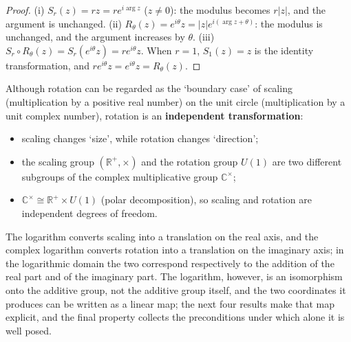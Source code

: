 \begin{proof}
(i) $S_r(z) = rz = re^{i\arg z}$ ($z \neq 0$): the modulus becomes $r|z|$, and the argument is unchanged.
(ii) $R_\theta(z) = e^{i\theta}z = |z|e^{i(\arg z + \theta)}$: the modulus is unchanged, and the argument increases by $\theta$.
(iii) $S_r \circ R_\theta(z) = S_r(e^{i\theta}z) = re^{i\theta}z$.
When $r = 1$, $S_1(z) = z$ is the identity transformation, and $re^{i\theta}z = e^{i\theta}z = R_\theta(z)$.
\end{proof}

\begin{remark}\label{rem:rotation_independence}
Although rotation can be regarded as the `boundary case' of scaling (multiplication by a positive real number) on the unit circle (multiplication by a unit complex number), rotation is an \textbf{independent transformation}:
\begin{itemize}
    \item scaling changes `size', while rotation changes `direction';
    \item the scaling group $(\mathbb{R}^+,\times)$ and the rotation group $U(1)$ are two different subgroups of the complex multiplicative group $\mathbb{C}^{\times}$;
    \item $\mathbb{C}^{\times} \cong \mathbb{R}^+ \times U(1)$ (polar decomposition), so scaling and rotation are independent degrees of freedom.
\end{itemize}
The logarithm converts scaling into a translation on the real axis, and the complex logarithm converts rotation into a translation on the imaginary axis; in the logarithmic domain the two correspond respectively to the addition of the real part and of the imaginary part. The logarithm, however, is an isomorphism onto the additive group, not the additive group itself, and the two coordinates it produces can be written as a linear map; the next four results make that map explicit, and the final property collects the preconditions under which alone it is well posed.
\end{remark}

